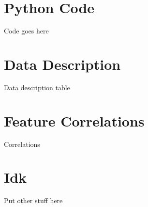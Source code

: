 
\chapter{Python Code}\label{ch:Python Code}

Code goes here

\chapter{Data Description}\label{ch:Data Description}

Data description table

\chapter{Feature Correlations}\label{ch:Feature Correlations}

Correlations

\chapter{Idk}\label{ch:Idk}

Put other stuff here